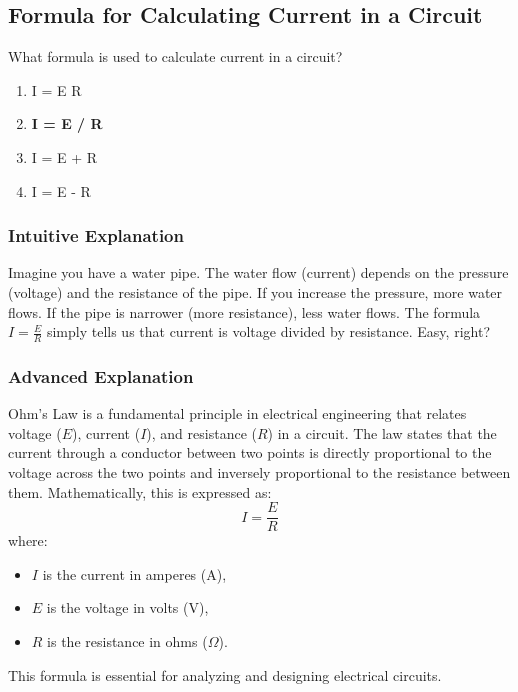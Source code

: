 \subsection{Formula for Calculating Current in a Circuit}
\label{T5D01}

\begin{tcolorbox}[colback=gray!10!white,colframe=black!75!black,title=T5D01]
What formula is used to calculate current in a circuit?
\begin{enumerate}[noitemsep]
    \item I = E R
    \item \textbf{I = E / R}
    \item I = E + R
    \item I = E - R
\end{enumerate}
\end{tcolorbox}

\subsubsection*{Intuitive Explanation}
Imagine you have a water pipe. The water flow (current) depends on the pressure (voltage) and the resistance of the pipe. If you increase the pressure, more water flows. If the pipe is narrower (more resistance), less water flows. The formula \( I = \frac{E}{R} \) simply tells us that current is voltage divided by resistance. Easy, right?

\subsubsection*{Advanced Explanation}
Ohm's Law is a fundamental principle in electrical engineering that relates voltage (\( E \)), current (\( I \)), and resistance (\( R \)) in a circuit. The law states that the current through a conductor between two points is directly proportional to the voltage across the two points and inversely proportional to the resistance between them. Mathematically, this is expressed as:
\[
I = \frac{E}{R}
\]
where:
\begin{itemize}
    \item \( I \) is the current in amperes (A),
    \item \( E \) is the voltage in volts (V),
    \item \( R \) is the resistance in ohms ($\Omega$).
\end{itemize}
This formula is essential for analyzing and designing electrical circuits.